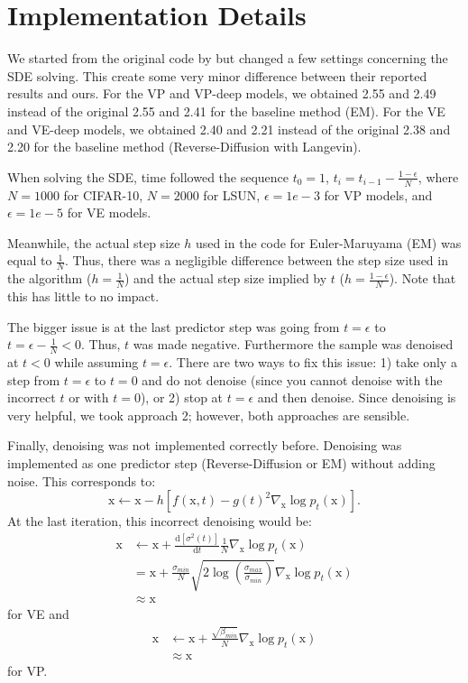 \documentclass{article}
\newcommand{\x}{\boldsymbol{\mathrm{x}}}
\newcommand{\dr}{\mathrm{d}}
\begin{document}
\clearpage

\section{Implementation Details} \label{sec:changes}

We started from the original code by \citet{song2020score} but changed a few settings concerning the SDE solving. This create some very minor difference between their reported results and ours. For the VP and VP-deep models, we obtained 2.55 and 2.49 instead of the original 2.55 and 2.41 for the baseline method (EM). For the VE and VE-deep models, we obtained 2.40 and 2.21 instead of the original 2.38 and 2.20 for the baseline method (Reverse-Diffusion with Langevin).

When solving the SDE, time followed the sequence $t_0 = 1$, $t_i = t_{i-1} - \frac{1-\epsilon}{N}$, where $N=1000$ for CIFAR-10, $N=2000$ for LSUN, $\epsilon = 1e-3$ for VP models, and $\epsilon = 1e-5$ for VE models.

Meanwhile, the actual step size $h$ used in the code for Euler-Maruyama (EM) was equal to $\frac{1}{N}$. Thus, there was a negligible difference between the step size used in the algorithm ($h=\frac{1}{N}$) and the actual step size implied by $t$ ($h=\frac{1-\epsilon}{N}$). Note that this has little to no impact.

The bigger issue is at the last predictor step was going from $t=\epsilon$ to $t=\epsilon - \frac{1}{N} < 0$. Thus, $t$ was made negative. Furthermore the sample was denoised at $t < 0$ while assuming $t=\epsilon$. There are two ways to fix this issue: 1) take only a step from $t=\epsilon$ to $t=0$ and do not denoise (since you cannot denoise with the incorrect $t$ or with $t=0$), or 2) stop at $t=\epsilon$ and then denoise. Since denoising is very helpful, we took approach 2; however, both approaches are sensible.

Finally, denoising was not implemented correctly before. Denoising was implemented as one predictor step (Reverse-Diffusion or EM) without adding noise. This corresponds to: \begin{equation*}
    \x \gets \x - h \left[ f(\x,t)-g(t)^2\nabla_{\x} \log p_t(\x) \right].
    \end{equation*}
At the last iteration, this incorrect denoising would be:
\begin{align*} \x &\gets \x + \frac{\dr[\sigma^2(t)]}{\dr t} \frac{1}{N} \nabla_{\x} \log p_t(\x) \\ 
&= \x + \frac{\sigma_{min}}{N} \sqrt{2 \log\left(\frac{\sigma_{max}}{\sigma_{min}}\right)} \nabla_{\x} \log p_t(\x) \\
&\approx \x
\end{align*} for VE and 
\begin{align*}\x &\gets \x + \frac{\sqrt{\beta_{min}}}{N} \nabla_{\x} \log p_t(\x) \\
&\approx \x
\end{align*} for VP.
\end{document}
